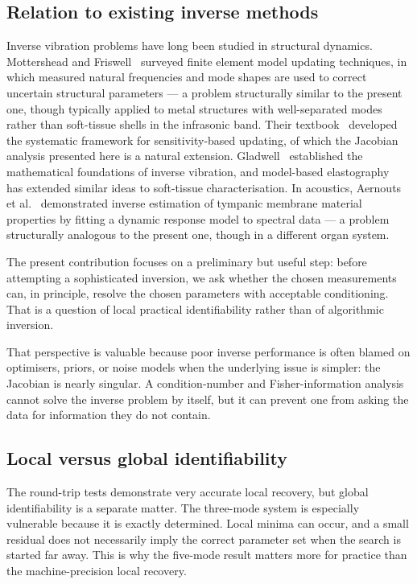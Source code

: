 \subsection{Relation to existing inverse methods}

Inverse vibration problems have long been studied in structural
dynamics.  Mottershead and Friswell~\cite{MottersheadFriswell1993} surveyed
finite element model updating techniques, in which measured natural
frequencies and mode shapes are used to correct uncertain structural
parameters --- a problem structurally similar to the present one, though
typically applied to metal structures with well-separated modes rather than
soft-tissue shells in the infrasonic band.  Their
textbook~\cite{FriswellMottershead1995} developed the systematic framework
for sensitivity-based updating, of which the Jacobian analysis presented
here is a natural extension.  Gladwell~\cite{Gladwell2004,Gladwell2005}
established the mathematical foundations of inverse vibration, and
model-based elastography~\cite{Doyley2012} has extended similar ideas to
soft-tissue characterisation.  In acoustics, Aernouts et
al.~\cite{Aernouts2012} demonstrated inverse estimation of tympanic membrane
material properties by fitting a dynamic response model to spectral data ---
a problem structurally analogous to the present one, though in a different
organ system.

The present contribution focuses on a preliminary but
useful step: before attempting a sophisticated inversion, we ask whether the
chosen measurements can, in principle, resolve the chosen parameters with
acceptable conditioning.  That is a question of local practical
identifiability rather than of algorithmic inversion.

That perspective is valuable because poor inverse performance is often blamed on
optimisers, priors, or noise models when the underlying issue is simpler: the
Jacobian is nearly singular.  A condition-number and Fisher-information analysis
cannot solve the inverse problem by itself, but it can prevent one from asking
the data for information they do not contain.

\subsection{Local versus global identifiability}

The round-trip tests demonstrate very accurate local recovery, but global
identifiability is a separate matter.  The three-mode system is especially
vulnerable because it is exactly determined.  Local minima can occur, and a
small residual does not necessarily imply the correct parameter set when the
search is started far away.  This is why the five-mode result matters more for
practice than the machine-precision local recovery.

